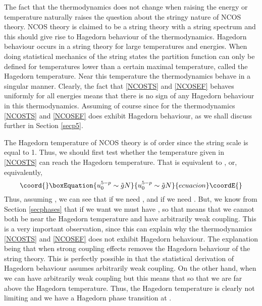 \documentclass[a4paper,twoside,titlepage,12pt]{article}
\begin{document}
The fact that the thermodynamics does not change when raising
the energy or temperature naturally raises the question 
about the stringy nature of NCOS theory. 
NCOS theory is claimed to be a string theory with a string spectrum and this
should give rise to Hagedorn behaviour of the thermodynamics.
Hagedorn behaviour occurs in a string theory for large temperatures
and energies. When doing statistical mechanics
of the string states the partition function can only be defined for
temperatures lower than a certain maximal temperature, called the 
Hagedorn temperature. Near this temperature the thermodynamics behave
in a singular manner.
Clearly, the fact that \eqref{NCOSTS} and \eqref{NCOSEF} behaves
uniformly for all energies means that there is no sign of any Hagedorn
behaviour in this thermodynamics. Assuming of course \coordHE{}
since for \coordHE{} the thermodynamics \eqref{NCOSTS} and \eqref{NCOSEF}
does exhibit Hagedorn behaviour, as we shall discuss further in 
Section \ref{secp5}.

The Hagedorn temperature of NCOS theory is of order \coordHE{}
since the string scale is equal to 1. 
Thus, we should first test whether the temperature 
given in \eqref{NCOSTS} can reach the Hagedorn temperature.
That \coordHE{} is equivalent to 
\coordHE{}, or, equivalently,
%
\begin{equation}\coord{}\boxEquation{
u_0^{5-p} \sim \tilde{g} N
}{
u_0^{5-p} \sim \tilde{g} N
}{ecuacion}\coordE{}\end{equation}
%
Thus, assuming \coordHE{}, we can see that if \coordHE{}
we need \coordHE{}, and if \coordHE{}
we need \coordHE{}.
But, we know from Section \ref{secphases} 
that if we want \coordHE{}
we must have \coordHE{}, so that means that we cannot both
be near the Hagedorn temperature and have arbitrarily weak coupling.
This is a very important observation, since this can explain why
the thermodynamics \eqref{NCOSTS} and \eqref{NCOSEF} does not
exhibit Hagedorn behaviour. 
The explanation being that when \coordHE{} strong coupling
effects removes the Hagedorn behaviour of the string theory. This
is perfectly possible in that the statistical derivation of  
Hagedorn behaviour assumes arbitrarily weak coupling.
On the other hand, when \coordHE{} we can have arbitrarily
weak coupling \coordHE{} but this means that
\coordHE{} so that we are far above the Hagedorn temperature.
Thus, the Hagedorn temperature is clearly not limiting and we have
a Hagedorn phase transition at \coordHE{}.
\end{document}
